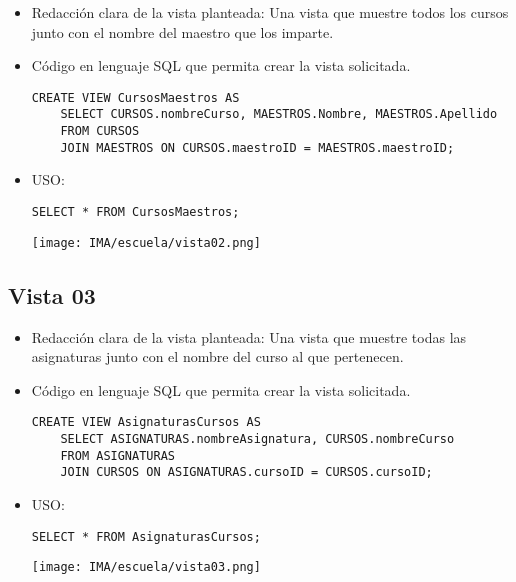 \begin{itemize}
  \item Redacción clara de la vista planteada: Una vista que muestre todos los cursos junto con el nombre del maestro que los imparte.
  \item Código en lenguaje SQL que permita crear la vista solicitada.
  
  \begin{lstlisting}[caption={Tablas para la BdDatos}, label={lst:sql_estadios}]
    CREATE VIEW CursosMaestros AS
    SELECT CURSOS.nombreCurso, MAESTROS.Nombre, MAESTROS.Apellido
    FROM CURSOS
    JOIN MAESTROS ON CURSOS.maestroID = MAESTROS.maestroID;
  \end{lstlisting}    
  
  \item USO:
  
  \begin{lstlisting}[caption={Tablas para la BdDatos}, label={lst:sql_estadios}]
    SELECT * FROM CursosMaestros;
  \end{lstlisting}    

  \begin{center}
    \texttt{[image: IMA/escuela/vista02.png]}
  \end{center}
\end{itemize}


\subsection*{Vista 03}

\begin{itemize}
  \item Redacción clara de la vista planteada: Una vista que muestre todas las asignaturas junto con el nombre del curso al que pertenecen.
  \item Código en lenguaje SQL que permita crear la vista solicitada.
  
  \begin{lstlisting}[caption={Tablas para la BdDatos}, label={lst:sql_estadios}]
    CREATE VIEW AsignaturasCursos AS
    SELECT ASIGNATURAS.nombreAsignatura, CURSOS.nombreCurso
    FROM ASIGNATURAS
    JOIN CURSOS ON ASIGNATURAS.cursoID = CURSOS.cursoID;
  \end{lstlisting}    
  
  \item USO:
  
  \begin{lstlisting}[caption={Tablas para la BdDatos}, label={lst:sql_estadios}]
    SELECT * FROM AsignaturasCursos;
  \end{lstlisting}    

  \begin{center}
    \texttt{[image: IMA/escuela/vista03.png]}
  \end{center}
\end{itemize}
